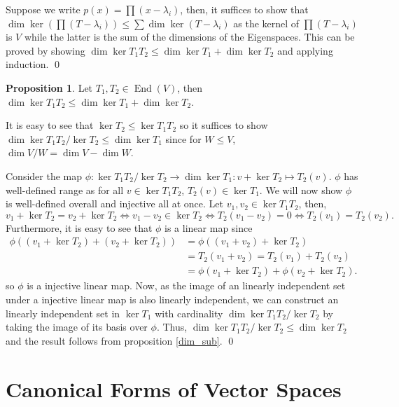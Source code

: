 \documentclass[
]{article}
\theoremstyle{definition}
\newtheorem{prop}{Proposition}[section]
\theoremstyle{definition}
\begin{document}
Suppose we write \(p(x) = \prod(x - \lambda_i)\), then, it suffices to
show that
\(\dim \ker (\prod(T - \lambda_i)) \le \sum \dim \ker(T - \lambda_i)\)
as the kernel of \(\prod(T - \lambda_i)\) is \(V\) while the latter is
the sum of the dimensions of the Eigenspaces. This can be proved by
showing \(\dim \ker T_1 T_2 \le \dim \ker T_1 + \dim \ker T_2\) and
applying induction. \qed

\begin{prop}
  Let \(T_1, T_2 \in \mathop{\mathrm{End}}(V)\), then 
  \(\dim \ker T_1 T_2 \le \dim \ker T_1 + \dim \ker T_2\).
\end{prop}
\proof

It is easy to see that \(\ker T_2 \le \ker T_1 T_2\) so it suffices to
show \(\dim \ker T_1 T_2 / \ker T_2 \le \dim \ker T_1\) since for
\(W \le V\), \(\dim V / W = \dim V - \dim W\).

Consider the map
\(\phi : \ker T_1 T_2 / \ker T_2 \to \dim \ker T_1 :  v + \ker T_2 \mapsto T_2(v)\).
\(\phi\) has well-defined range as for all \(v \in \ker T_1 T_2\),
\(T_2(v) \in \ker T_1\). We will now show \(\phi\) is well-defined
overall and injective all at once. Let \(v_1, v_2 \in \ker T_1 T_2\),
then,
\[v_1 + \ker T_2 = v_2 + \ker T_2 \iff v_1 - v_2 \in \ker T_2 \iff T_2 (v_1 - v_2) = 0
  \iff T_2(v_1) = T_2(v_2).\] Furthermore, it is easy to see that
\(\phi\) is a linear map since \begin{align*}
    \phi((v_1 + \ker T_2) + (v_2 + \ker T_2)) & = \phi((v_1 + v_2) + \ker T_2) \\
      & = T_2(v_1 + v_2) = T_2(v_1) + T_2(v_2) \\
      & = \phi(v_1 + \ker T_2) + \phi(v_2 + \ker T_2).
  \end{align*} so \(\phi\) is a injective linear map. Now, as the image
of an linearly independent set under a injective linear map is also
linearly independent, we can construct an linearly independent set in
\(\ker T_1\) with cardinality \(\dim \ker T_1 T_2 / \ker T_2\) by taking
the image of its basis over \(\phi\). Thus,
\(\dim \ker T_1 T_2 / \ker T_2 \le \dim \ker T_2\) and the result
follows from proposition \ref{dim_sub}. \qed

\newpage

\hypertarget{canonical-forms-of-vector-spaces}{%
\section{Canonical Forms of Vector
Spaces}\label{canonical-forms-of-vector-spaces}}
\end{document}
